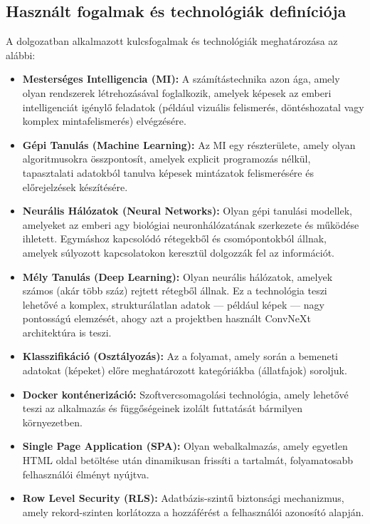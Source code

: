 \documentclass[
	parspace, %
]{elteikthesis}[2024/04/26]
\begin{document}
\subsection{Használt fogalmak és technológiák definíciója}
A dolgozatban alkalmazott kulcsfogalmak és technológiák meghatározása az alábbi:
\begin{itemize}
    \item \textbf{Mesterséges Intelligencia (MI):} A számítástechnika azon ága, amely olyan rendszerek létrehozásával foglalkozik, amelyek képesek az emberi intelligenciát igénylő feladatok (például vizuális felismerés, döntéshozatal vagy komplex mintafelismerés) elvégzésére.
    \item \textbf{Gépi Tanulás (Machine Learning):} Az MI egy részterülete, amely olyan algoritmusokra összpontosít, amelyek explicit programozás nélkül, tapasztalati adatokból tanulva képesek mintázatok felismerésére és előrejelzések készítésére.
    \item \textbf{Neurális Hálózatok (Neural Networks):} Olyan gépi tanulási modellek, amelyeket az emberi agy biológiai neuronhálózatának szerkezete és működése ihletett. Egymáshoz kapcsolódó rétegekből és csomópontokból állnak, amelyek súlyozott kapcsolatokon keresztül dolgozzák fel az információt.
    \item \textbf{Mély Tanulás (Deep Learning):} Olyan neurális hálózatok, amelyek számos (akár több száz) rejtett rétegből állnak. Ez a technológia teszi lehetővé a komplex, strukturálatlan adatok — például képek — nagy pontosságú elemzését, ahogy azt a projektben használt ConvNeXt architektúra is teszi.
    \item \textbf{Klasszifikáció (Osztályozás):} Az a folyamat, amely során a bemeneti adatokat (képeket) előre meghatározott kategóriákba (állatfajok) soroljuk.
    \item \textbf{Docker konténerizáció:} Szoftvercsomagolási technológia, amely lehetővé teszi az alkalmazás és függőségeinek izolált futtatását bármilyen környezetben.
    \item \textbf{Single Page Application (SPA):} Olyan webalkalmazás, amely egyetlen HTML oldal betöltése után dinamikusan frissíti a tartalmát, folyamatosabb felhasználói élményt nyújtva.
    \item \textbf{Row Level Security (RLS):} Adatbázis-szintű biztonsági mechanizmus, amely rekord-szinten korlátozza a hozzáférést a felhasználói azonosító alapján.
\end{itemize}
\end{document}
